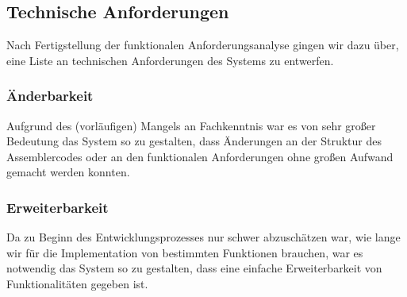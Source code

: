 \documentclass[paper=a4,fontsize=12pt,twocolumn]{scrreprt}
\begin{document}

\subsection{Technische Anforderungen}
Nach Fertigstellung der funktionalen Anforderungsanalyse gingen wir dazu über, eine Liste an technischen Anforderungen des Systems zu entwerfen.

\subsubsection{Änderbarkeit}
Aufgrund des (vorläufigen) Mangels an Fachkenntnis war es von sehr großer Bedeutung das System so zu gestalten, dass Änderungen an der Struktur des Assemblercodes oder an den funktionalen Anforderungen ohne großen Aufwand gemacht werden konnten.

\subsubsection{Erweiterbarkeit}
Da zu Beginn des Entwicklungsprozesses nur schwer abzuschätzen war, wie lange wir für die Implementation von bestimmten Funktionen brauchen, war es notwendig das System so zu gestalten, dass eine einfache Erweiterbarkeit von Funktionalitäten gegeben ist.
\end{document}
